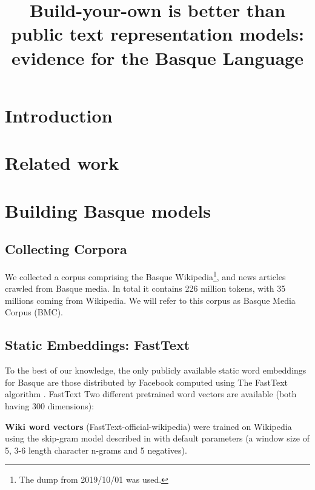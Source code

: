 \documentclass[10pt, a4paper]{article}
\title{Build-your-own is better than public text representation models: evidence for the Basque Language}
\begin{document}
\maketitleabstract

\section{Introduction}\label{sec:introduction}



\section{Related work}\label{sec:related-work}



\section{Building Basque models}\label{sec:build-basq-models}

\subsection{Collecting Corpora}\label{sec:build-basq-models:corpora}

 We collected a corpus comprising the Basque Wikipedia\footnote{The dump from 2019/10/01 was used.}, and news articles crawled from Basque media. In total it contains 226 million tokens, with 35 millions coming from Wikipedia. We will refer to this corpus as Basque Media Corpus (BMC).




\subsection{Static Embeddings: FastText}\label{sec:build-basq-models:static}

To the best of our knowledge, the only publicly available static word embeddings for Basque are those distributed by Facebook computed using The FastText algorithm \cite{fasttext1_bojanowski2017enriching}. FastText  Two different pretrained word vectors are available (both having 300 dimensions):

\textbf{Wiki word vectors} (FastText-official-wikipedia) were trained on Wikipedia using the skip-gram model described in \cite{fasttext1_bojanowski2017enriching} with default parameters (a window size of 5, 3-6 length character n-grams and 5 negatives).
\end{document}
